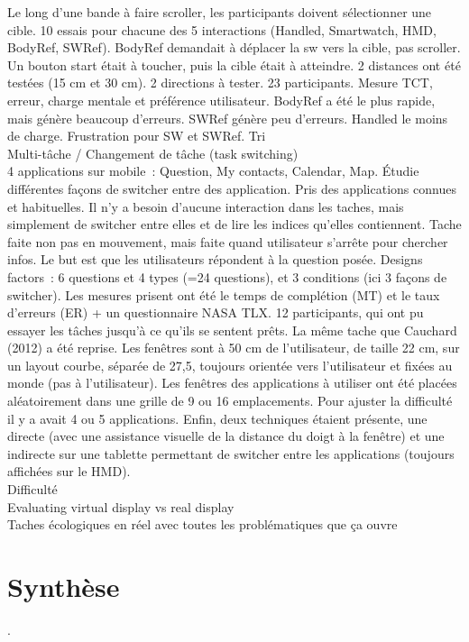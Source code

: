         	Le long d'une bande à faire scroller, les participants doivent sélectionner une cible. 10 essais pour chacune des 5 interactions (Handled, Smartwatch, HMD, BodyRef, SWRef). BodyRef demandait à déplacer la sw vers la cible, pas scroller. Un bouton start était à toucher, puis la cible était à atteindre. 2 distances ont été testées (15 cm et 30 cm). 2 directions à tester. 23 participants. Mesure TCT, erreur, charge mentale et préférence utilisateur. BodyRef a été le plus rapide, mais génère beaucoup d'erreurs. SWRef génère peu d'erreurs. Handled le moins de charge. Frustration pour SW et SWRef. \cite{}
        Tri \cite{RobertsonCzerwinskiLarsonEtAl1998} \\
        Multi-tâche / Changement de tâche (task switching) \\
            4 applications sur mobile~: Question, My contacts, Calendar, Map. Étudie différentes façons de switcher entre des application. Pris des applications connues et habituelles. Il n'y a besoin d'aucune interaction dans les taches, mais simplement de switcher entre elles et de lire les indices qu'elles contiennent. Tache faite non pas en mouvement, mais faite quand utilisateur s'arrête pour chercher infos. Le but est que les utilisateurs répondent à la question posée. Designs factors~: 6 questions et 4 types (=24 questions), et 3 conditions (ici 3 façons de switcher). Les mesures prisent ont été le temps de complétion (MT) et le taux d'erreurs (ER) + un questionnaire NASA TLX. 12 participants, qui ont pu essayer les tâches jusqu'à ce qu'ils se sentent prêts. \cite{CauchardLoechtefeldFraserEtAl2012} 
            La même tache que Cauchard (2012) a été reprise. Les fenêtres sont à 50 cm de l'utilisateur, de taille 22 cm, sur un layout courbe, séparée de 27,5\textdegree, toujours orientée vers l'utilisateur et fixées au monde (pas à l'utilisateur). Les fenêtres des applications à utiliser ont été placées aléatoirement dans une grille de 9 ou 16 emplacements. Pour ajuster la difficulté il y a avait 4 ou 5 applications. Enfin, deux techniques étaient présente, une directe (avec une assistance visuelle de la distance du doigt à la fenêtre) et une indirecte sur une tablette permettant de switcher entre les applications (toujours affichées sur le HMD). \cite{EnsFinneganIrani2014} \\
    Difficulté \\

    Evaluating virtual display vs real display \\ 

    Taches écologiques en réel avec toutes les problématiques que ça ouvre \cite{KoelleKranzMoeller2015} \cite{DenningDehlawiKohno2014}



\section*{Synthèse}
.